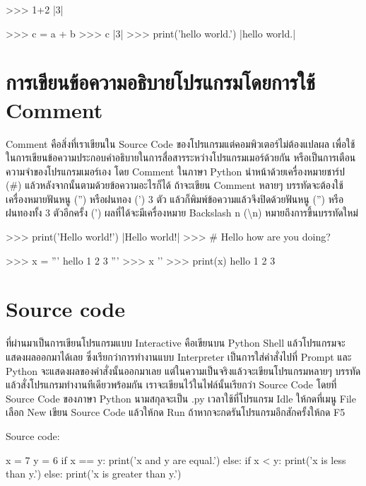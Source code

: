 \begin{pycode}
>>> 1+2
|3|
\end{pycode}

\begin{pycode}
>>> c = a + b
>>> c
|3|
>>> print('hello world.')
|hello world.|

\end{pycode}


\section{การเขียนข้อความอธิบายโปรแกรมโดยการใช้ Comment}

Comment คือสิ่งที่เราเขียนใน Source Code ของโปรแกรมแต่คอมพิวเตอร์ไม่ต้องแปลผล เพื่อใช้ในการเขียนข้อความประกอบคำอธิบายในการสื่อสารระหว่างโปรแกรมเมอร์ด้วยกัน หรือเป็นการเตือนความจำของโปรแกรมเมอร์เอง โดย Comment ในภาษา Python นำหน้าด้วยเครื่องหมายชาร์ป (\#) แล้วหลังจากนั้นตามด้วยข้อความอะไรก็ได้ ถ้าจะเขียน Comment หลายๆ บรรทัดจะต้องใช้เครื่องหมายฟันหนู ('') หรือฝนทอง (')  3 ตัว แล้วก็พิมพ์ข้อความแล้วจึงปิดด้วยฟันหนู ('') หรือฝนทองทั้ง 3 ตัวอีกครั้ง (') ผลที่ได้จะมีเครื่องหมาย Backslash n (\textbackslash n) หมายถึงการขึ้นบรรทัดใหม่

\begin{pycode}
>>> print('Hello world!')
|Hello world!|
>>> # Hello how are you doing?
\end{pycode}

\begin{pycode}
>>> x = '''
hello
1
2
3
'''
>>> x
'\nhello{}\n'
>>> print(x)
hello
1
2
3
\end{pycode}


\section{Source code}

ที่ผ่านมาเป็นการเขียนโปรแกรมแบบ Interactive คือเขียนบน Python Shell แล้วโปรแกรมจะแสดงผลออกมาได้เลย ซึ่งเรียกว่าการทำงานแบบ Interpreter เป็นการใส่คำสั่งไปที่ Prompt และ Python จะแสดงผลของคำสั่งนั้นออกมาเลย แต่ในความเป็นจริงแล้วจะเขียนโปรแกรมหลายๆ บรรทัดแล้วสั่งโปรแกรมทำงานทีเดียวพร้อมกัน เราจะเขียนไว้ในไฟล์นั้นเรียกว่า Source Code โดยที่ Source Code ของภาษา Python นามสกุลจะเป็น .py เวลาใช้ที่โปรแกรม Idle ให้กดที่เมนู File เลือก New เขียน Source Code แล้วให้กด Run ถ้าหากจะกดรันโปรแกรมอีกสักครั้งให้กด F5

Source code:

\begin{pycode}
x = 7
y = 6
if x == y: print('x and y are equal.')
else:
    if x < y: print('x is less than y.')
    else: print('x is greater than y.')
\end{pycode}

